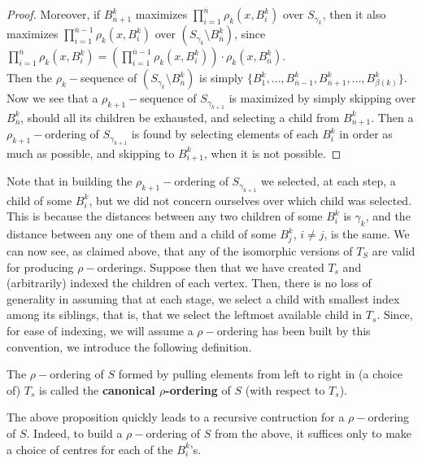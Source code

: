 \begin{proof}
Moreover, if $B^k_{\overline{n}+1}$ maximizes $\prod^{\overline{n}}_{i=1} \rho_{k}(x, B^k_i)$ over $S_{\gamma_k}$, then it also maximizes $\prod^{\overline{n}-1}_{i=1} \rho_{k}(x, B^k_i)$ over $(S_{\gamma_k} \setminus B^k_{\overline{n}})$, since $\prod^{\overline{n}}_{i=1} \rho_{k}(x, B^k_i) = (\prod^{\overline{n}-1}_{i=1} \rho_{k}(x, B^k_i)) \cdot \rho_{k}(x, B^k_{\overline{n}})$.\\

Then the $\rho_k-$sequence of  $(S_{\gamma_k}\setminus B^k_{\overline{n}})$ is simply $\{B^k_1,\ldots, B^k_{\overline{n}-1}, B^k_{\overline{n}+1},\ldots, B^k_{\beta(k)}\}$.\\

Now we see that a $\rho_{k+1}-$sequence of $S_{\gamma_{k+1}}$ is maximized by simply skipping over $B^k_{\overline{n}}$, should all its children be exhausted, and selecting a child from $B^k_{\overline{n}+1}$. Then a $\rho_{k+1}-$ordering of $S_{\gamma_{k+1}}$ is found by selecting elements of each $B^k_i$ in order as much as possible, and skipping to $B^k_{i+1}$, when it is not possible.

\end{proof}
Note that in building the $\rho_{k+1}-$ordering of $S_{\gamma_{k+1}}$ we selected, at each step, a child of some $B^k_i$, but we did not concern ourselves over which child was selected. This is because the distances between any two children of some $B^k_i$  is $\gamma_k$, and the distance between any one of them and a child of some $B^k_j$, $i \neq j$, is the same. We can now see, as claimed above, that any of the isomorphic versions of $T_ S$ are valid for producing $\rho-$orderings. Suppose then that we have created $T_s$ and (arbitrarily) indexed the children of each vertex. Then, there is no loss of generality in assuming that at each stage, we select a child with smallest index among its siblings, that is, that we select the leftmost available child in $T_s$. Since, for ease of indexing, we will assume a $\rho-$ordering has been built by this convention, we introduce the following definition.\\

\begin{definition}
The $\rho-$ordering of $S$ formed by pulling elements from left to right in (a choice of) $T_s$ is called the \textbf{canonical $\rho$-ordering} of $S$ (with respect to $T_s$).
\end{definition}

The above proposition quickly leads to a recursive contruction for a $\rho-$ordering of $S$. Indeed, to build a $\rho-$ordering of $S$ from the above, it suffices only to make a choice of centres for each of the $B^k_i$'s.\\

